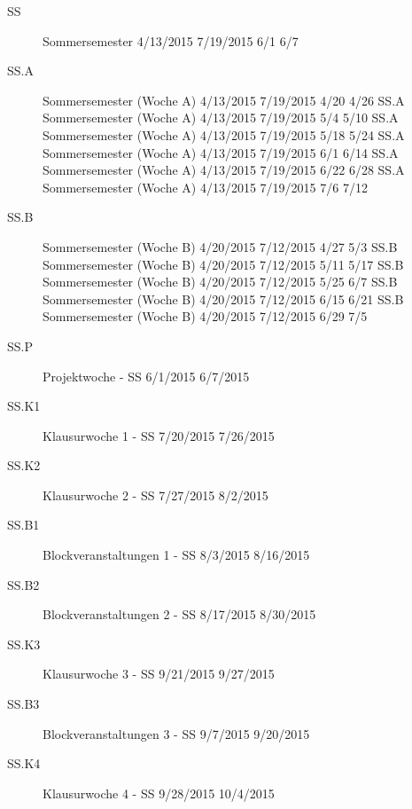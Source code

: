 \begin{description}
	\item[SS] Sommersemester	4/13/2015	7/19/2015  6/1	6/7
	\item[SS.A] Sommersemester (Woche A)	4/13/2015	7/19/2015 4/20	4/26
		SS.A	Sommersemester (Woche A)	4/13/2015	7/19/2015 5/4	5/10
		SS.A	Sommersemester (Woche A)	4/13/2015	7/19/2015 5/18	5/24
		SS.A	Sommersemester (Woche A)	4/13/2015	7/19/2015 6/1	6/14
		SS.A	Sommersemester (Woche A)	4/13/2015	7/19/2015 6/22	6/28
		SS.A	Sommersemester (Woche A)	4/13/2015	7/19/2015 7/6	7/12
	\item[SS.B]	Sommersemester (Woche B)	4/20/2015	7/12/2015 4/27	5/3
		SS.B	Sommersemester (Woche B)	4/20/2015	7/12/2015 5/11	5/17
		SS.B	Sommersemester (Woche B)	4/20/2015	7/12/2015 5/25	6/7
		SS.B	Sommersemester (Woche B)	4/20/2015	7/12/2015 6/15	6/21
		SS.B	Sommersemester (Woche B)	4/20/2015	7/12/2015 6/29	7/5
	\item[SS.P]	Projektwoche - SS	6/1/2015	6/7/2015	 	 	 	
	\item[SS.K1]	Klausurwoche 1 - SS	7/20/2015	7/26/2015	 	 	 	
	\item[SS.K2]	Klausurwoche 2 - SS	7/27/2015	8/2/2015	 	 	 	
	\item[SS.B1]	Blockveranstaltungen 1 - SS	8/3/2015	8/16/2015
	\item[SS.B2]	Blockveranstaltungen 2 - SS	8/17/2015	8/30/2015
	\item[SS.K3]	Klausurwoche 3 - SS	9/21/2015	9/27/2015	 	 	 	
	\item[SS.B3]	Blockveranstaltungen 3 - SS	9/7/2015	9/20/2015
	\item[SS.K4]	Klausurwoche 4 - SS	9/28/2015	10/4/2015 	 	 	
		
\end{description}